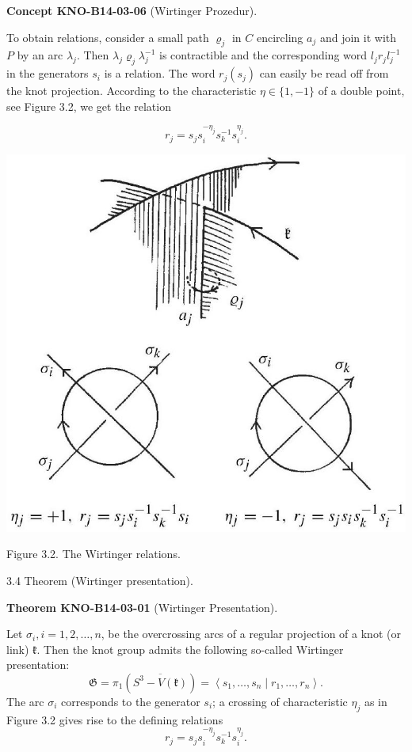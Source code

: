 \documentclass[10pt, letterpaper]{article}
\newcommand{\CustomHeading}[3]{%
  \par\medskip\noindent%
  \textbf{#1 #2} \textnormal{(#3)}.\enskip%
}
\newenvironment{THEO}[2]{\begin{unitbox}\CustomHeading{Theorem}{#1}{#2}}{\end{unitbox}}
\newenvironment{CONC}[2]{\begin{unitbox}\CustomHeading{Concept}{#1}{#2}}{\end{unitbox}}
\begin{document}
\begin{CONC}{KNO-B14-03-06}{Wirtinger Prozedur}
To obtain relations, consider a small path $\varrho_{j}$ in $C$ encircling $a_{j}$ and join it with $P$ by an arc $\lambda_{j}$. Then $\lambda_{j} \varrho_{j} \lambda_{j}^{-1}$ is contractible and the corresponding word $l_{j} r_{j} l_{j}^{-1}$ in the generators $s_{i}$ is a relation. The word $r_{j}\left(s_{j}\right)$ can easily be read off from the knot projection. According to the characteristic $\eta \in\{1,-1\}$ of a double point, see Figure 3.2, we get the relation

$$
r_{j}=s_{j} s_{i}^{-\eta_{j}} s_{k}^{-1} s_{i}^{\eta_{j}} .
$$

\begin{center}
\includegraphics[scale=0.2]{2025_05_21_9c06be8de7a55410f8c1g-047}
\end{center}
Figure 3.2. The Wirtinger relations.
\end{CONC}


3.4 Theorem (Wirtinger presentation). 

\begin{THEO}{KNO-B14-03-01}{Wirtinger Presentation}
Let $\sigma_{i}, i=1,2, \ldots, n$, be the overcrossing arcs of a regular projection of a knot (or link) $\mathfrak{k}$. Then the knot group admits the following so-called Wirtinger presentation:
$$
\mathfrak{G}=\pi_{1}\left(\overline{S^{3}-V(\mathfrak{k})}\right)=\left\langle s_{1}, \ldots, s_{n} \mid r_{1}, \ldots, r_{n}\right\rangle .
$$
The arc $\sigma_{i}$ corresponds to the generator $s_{i}$; a crossing of characteristic $\eta_{j}$ as in Figure 3.2 gives rise to the defining relations
$$
r_{j}=s_{j} s_{i}^{-\eta_{j}} s_{k}^{-1} s_{i}^{\eta_{j}} .
$$
\end{THEO}
\end{document}
